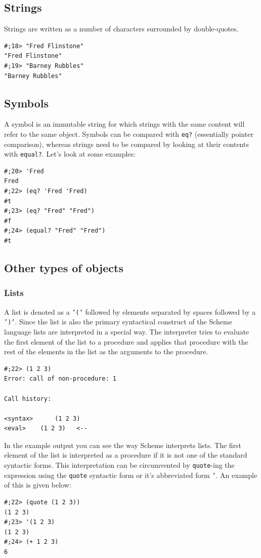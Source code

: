 \documentclass[12pt,a4paper,english,twoside]{article}
\begin{document}
\subsection{Strings}
Strings are written as a number of characters surrounded by double-quotes.
\begin{lstlisting}
#;18> "Fred Flinstone"
"Fred Flinstone"    
#;19> "Barney Rubbles"
"Barney Rubbles"
\end{lstlisting}
\subsection{Symbols}
A symbol is an immutable string for which strings with the same content 
will refer to the same object. Symbols can be compared with 
\texttt{eq?} (essentially pointer comparison), whereas strings need to be 
compared by looking at their contents with \texttt{equal?}. Let's look at some 
examples:
\begin{lstlisting}
#;20> 'Fred
Fred
#;22> (eq? 'Fred 'Fred)
#t
#;23> (eq? "Fred" "Fred")
#f
#;24> (equal? "Fred" "Fred")
#t
\end{lstlisting}
\subsection{Other types of objects}
\subsubsection{Lists}
A list is denoted as a \texttt{'('} followed by elements separated by spaces 
followed by a \texttt{')'}. Since the list is also the primary syntactical 
construct of the Scheme language lists are interpreted in a special way. The 
interpreter tries to evaluate the first element of the list to a procedure and 
applies that procedure with the rest of the elements in the list as the 
arguments to the procedure.
\begin{lstlisting}
#;22> (1 2 3)
Error: call of non-procedure: 1

Call history:

<syntax>	  (1 2 3)
<eval>	  (1 2 3)	<--

\end{lstlisting}
In the example output you can see the way Scheme interprets lists. The first 
element of the list is interpreted as a procedure if it is not one of the 
standard syntactic forms. This interpretation can be circumvented by 
\texttt{quote}-ing the expression using the \texttt{quote} syntactic form or 
it's abbreviated form \texttt{'}. An example of this is given below:
\begin{lstlisting}
#;22> (quote (1 2 3))
(1 2 3)
#;23> '(1 2 3)
(1 2 3)
#;24> (+ 1 2 3)
6
\end{lstlisting}
\end{document}
